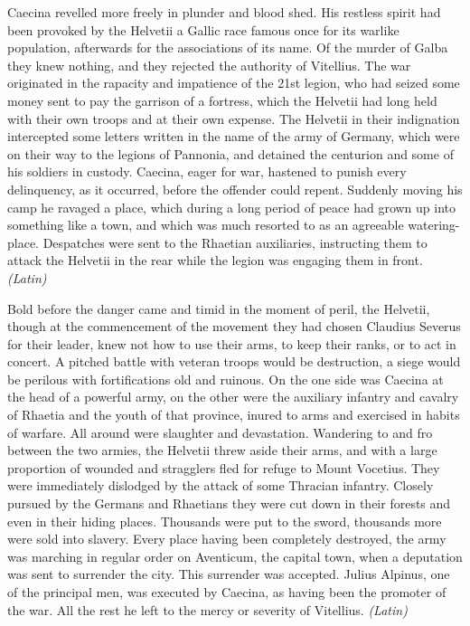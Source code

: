 
Caecina revelled more freely in plunder and blood shed. His restless spirit had been provoked by the Helvetii a Gallic race famous once for its warlike population, afterwards for the associations of its name. Of the murder of Galba they knew nothing, and they rejected the authority of Vitellius. The war originated in the rapacity and impatience of the 21st legion, who had seized some money sent to pay the garrison of a fortress, which the Helvetii had long held with their own troops and at their own expense. The Helvetii in their indignation intercepted some letters written in the name of the army of Germany, which were on their way to the legions of Pannonia, and detained the centurion and some of his soldiers in custody. Caecina, eager for war, hastened to punish every delinquency, as it occurred, before the offender could repent. Suddenly moving his camp he ravaged a place, which during a long period of peace had grown up into something like a town, and which was much resorted to as an agreeable watering-place. Despatches were sent to the Rhaetian auxiliaries, instructing them to attack the Helvetii in the rear while the legion was engaging them in front. \emph{(Latin)}


Bold before the danger came and timid in the moment of peril, the Helvetii, though at the commencement of the movement they had chosen Claudius Severus for their leader, knew not how to use their arms, to keep their ranks, or to act in concert. A pitched battle with veteran troops would be destruction, a siege would be perilous with fortifications old and ruinous. On the one side was Caecina at the head of a powerful army, on the other were the auxiliary infantry and cavalry of Rhaetia and the youth of that province, inured to arms and exercised in habits of warfare. All around were slaughter and devastation. Wandering to and fro between the two armies, the Helvetii threw aside their arms, and with a large proportion of wounded and stragglers fled for refuge to Mount Vocetius. They were immediately dislodged by the attack of some Thracian infantry. Closely pursued by the Germans and Rhaetians they were cut down in their forests and even in their hiding places. Thousands were put to the sword, thousands more were sold into slavery. Every place having been completely destroyed, the army was marching in regular order on Aventicum, the capital town, when a deputation was sent to surrender the city. This surrender was accepted. Julius Alpinus, one of the principal men, was executed by Caecina, as having been the promoter of the war. All the rest he left to the mercy or severity of Vitellius. \emph{(Latin)}

